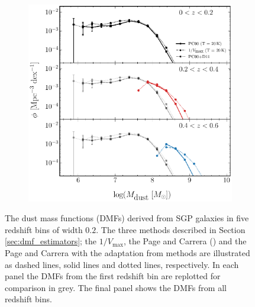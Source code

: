 \begin{figure}
	\centering
    \begin{subfigure}{\textwidth}
	\includegraphics[width=\columnwidth]{Figures/dmf_methods_part1.pdf}
    \end{subfigure}
    \caption[Dust mass functions derived from SGP galaxies]{The dust mass functions (DMFs) derived from SGP galaxies in five redshift bins of width $0.2$. The three methods described in Section \ref{sec:dmf_estimators}; the $1/V_{\textrm{max}}$, the Page and Carrera (\citealt{Page_2000}) and the Page and Carrera with the adaptation from \citealt{Dunne_2011} methods are illustrated as dashed lines, solid lines and dotted lines, respectively. In each panel the DMFs from the first redshift bin are replotted for comparison in grey. The final panel shows the DMFs from all redshift bins.}
	\label{fig:dmf_methods}
\end{figure}

